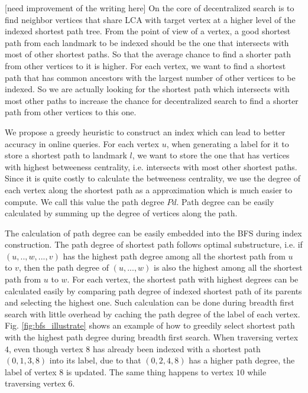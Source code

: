 [need improvement of the writing here]
On the core of decentralized search is to find neighbor vertices that share LCA with target vertex at a higher level of the indexed shortest path tree. From the point of view of a vertex, a good shortest path from each landmark to be indexed should be the one that intersects with most of other shortest paths. So that the average chance to find a shorter path from other vertices to it is higher. For each vertex, we want to find a shortest path that has common ancestors with the largest number of other vertices to be indexed. So we are actually looking for the shortest path which intersects with most other paths to increase the chance for decentralized search to find a shorter path from other vertices to this one.

We propose a greedy heuristic to construct an index which can lead to better accuracy in online queries. For each vertex $u$, when generating a label for it to store a shortest path to landmark $l$, we want to store the one that has vertices with highest betweeness centrality, i.e. intersects with most other shortest paths. Since it is quite costly to calculate the betweeness centrality, we use the degree of each vertex along the shortest path as a approximation which is much easier to compute. We call this value the path degree $Pd$. Path degree can be easily calculated by summing up the degree of vertices along the path.

The calculation of path degree can be easily embedded into the BFS during index construction. The path degree of shortest path follows optimal substructure, i.e. if $(u, .., w, ..., v)$ has the highest path degree among all the shortest path from $u$ to $v$, then the path degree of $(u, ..., w)$ is also the highest among all the shortest path from $u$ to $w$. For each vertex, the shortest path with highest degrees can be calculated easily by comparing path degree of indexed shortest path of its parents and selecting the highest one. Such calculation can be done during breadth first search with little overhead by caching the path degree of the label of each vertex. Fig. \ref{fig:bfs_illustrate} shows an example of how to greedily select shortest path with the highest path degree during breadth first search. When traversing vertex $4$, even though vertex $8$ has already been indexed with a shortest path $(0, 1, 3, 8)$ into its label, due to that $(0, 2, 4, 8)$ has a higher path degree, the label of vertex $8$ is updated. The same thing happens to vertex $10$ while traversing vertex $6$.

